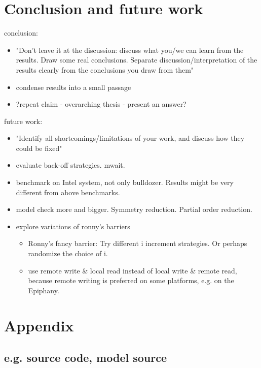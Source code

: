\documentclass[a4paper, 10pt]{article}
\begin{document}
\begin{enumerate}
\section{Conclusion and future work}
\label{sec:conclusion}
conclusion:
\begin{itemize}
	\item "Don't leave it at the discussion: discuss what you/we can learn from the results. Draw some real conclusions. Separate discussion/interpretation of the results clearly from the conclusions you draw from them"
	\item condense results into a small passage
	\item ?repeat claim - overarching thesis - present an answer?
\end{itemize}

future work:
\begin{itemize}
	\item "Identify all shortcomings/limitations of your work, and discuss how they could be fixed"
	\item evaluate back-off strategies. mwait.
	\item benchmark on Intel system, not only bulldozer. Results might be very different from above benchmarks.
	\item model check more and bigger. Symmetry reduction. Partial order reduction.
	\item explore variations of ronny's barriers
		\begin{itemize}
			\item Ronny's fancy barrier: Try different i increment strategies. Or perhaps randomize the choice of i.
			\item use remote write \& local read instead of local write \& remote read, because remote writing is preferred on some platforms, e.g. on the Epiphany\cite{epiphany}.
		\end{itemize}
\end{itemize}


\appendix

\pagebreak
\section{Appendix}
\label{sec:appendix}
\subsection{e.g. source code, model source}


\end{enumerate}
\end{document}
